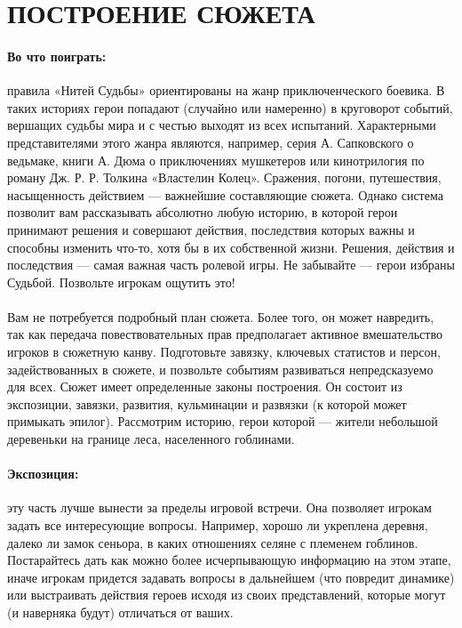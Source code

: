 \section{ПОСТРОЕНИЕ СЮЖЕТА}
\paragraph{Во что поиграть:} правила «Нитей Судьбы» ориентированы на жанр приключенческого боевика. В таких историях герои попадают (случайно или намеренно) в круговорот событий, вершащих судьбы мира и с честью выходят из всех испытаний. Характерными представителями этого жанра являются, например, серия А. Сапковского о ведьмаке, книги А. Дюма о приключениях мушкетеров или кинотрилогия по роману Дж. Р. Р. Толкина «Властелин Колец». Сражения, погони, путешествия, насыщенность действием — важнейшие составляющие сюжета. Однако система позволит вам рассказывать абсолютно любую историю, в которой герои принимают решения и совершают действия, последствия которых важны и способны изменить что-то, хотя бы в их собственной жизни. Решения, действия и последствия — самая важная часть ролевой игры. Не забывайте — герои избраны Судьбой. Позвольте игрокам ощутить это!
\paragraph{}
Вам не потребуется подробный план сюжета. Более того, он может навредить, так как передача повествовательных прав предполагает активное вмешательство игроков в сюжетную канву. Подготовьте завязку, ключевых статистов и персон, задействованных в сюжете, и позвольте событиям развиваться непредсказуемо для всех. Сюжет имеет определенные законы построения. Он состоит из экспозиции, завязки, развития, кульминации и развязки (к которой может примыкать эпилог). Рассмотрим историю, герои которой — жители небольшой деревеньки на границе леса, населенного гоблинами.
\paragraph{Экспозиция:} эту часть лучше вынести за пределы игровой встречи. Она позволяет игрокам задать все интересующие вопросы. Например, хорошо ли укреплена деревня, далеко ли замок сеньора, в каких отношениях селяне с племенем гоблинов. Постарайтесь дать как можно более исчерпывающую информацию на этом этапе, иначе игрокам придется задавать вопросы в дальнейшем (что повредит динамике) или выстраивать действия героев исходя из своих представлений, которые могут (и наверняка будут) отличаться от ваших.
